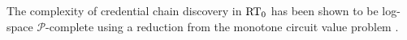 The complexity of credential chain discovery in $\text{RT}_0$ has been shown to be
log-space $\mathcal{P}$-complete using a reduction from the monotone circuit
value problem \cite{Li:DCDTM}.

%
%
%
%
%
